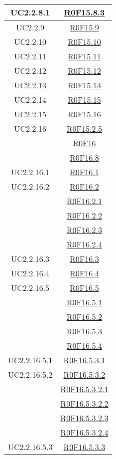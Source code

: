 \documentclass[../AnalisiDeiRequisiti.tex]{subfiles}
\begin{document}
\begin{longtable}{|c|c|}
	UC2.2.8.1 & \hyperlink{R0F15.8.3}{R0F15.8.3}\\\hline
	UC2.2.9 & \hyperlink{R0F15.9}{R0F15.9}\\\hline
	UC2.2.10 & \hyperlink{R0F15.10}{R0F15.10}\\\hline
	UC2.2.11 & \hyperlink{R0F15.11}{R0F15.11}\\\hline
	UC2.2.12 & \hyperlink{R0F15.12}{R0F15.12}\\\hline
	UC2.2.13 & \hyperlink{R0F15.13}{R0F15.13}\\\hline
	UC2.2.14 & \hyperlink{R0F15.15}{R0F15.15}\\\hline
	UC2.2.15 & \hyperlink{R0F15.16}{R0F15.16}\\\hline
	UC2.2.16 & \hyperlink{R0F15.2.5}{R0F15.2.5}\\& \hyperlink{R0F16}{R0F16}\\& \hyperlink{R0F16.8}{R0F16.8}\\\hline
	UC2.2.16.1 & \hyperlink{R0F16.1}{R0F16.1}\\\hline
	UC2.2.16.2 & \hyperlink{R0F16.2}{R0F16.2}\\& \hyperlink{R0F16.2.1}{R0F16.2.1}\\& \hyperlink{R0F16.2.2}{R0F16.2.2}\\& \hyperlink{R0F16.2.3}{R0F16.2.3}\\& \hyperlink{R0F16.2.4}{R0F16.2.4}\\\hline
	UC2.2.16.3 & \hyperlink{R0F16.3}{R0F16.3}\\\hline
	UC2.2.16.4 & \hyperlink{R0F16.4}{R0F16.4}\\\hline
	UC2.2.16.5 & \hyperlink{R0F16.5}{R0F16.5}\\& \hyperlink{R0F16.5.1}{R0F16.5.1}\\& \hyperlink{R0F16.5.2}{R0F16.5.2}\\& \hyperlink{R0F16.5.3}{R0F16.5.3}\\& \hyperlink{R0F16.5.4}{R0F16.5.4}\\\hline
	UC2.2.16.5.1 & \hyperlink{R0F16.5.3.1}{R0F16.5.3.1}\\\hline
	UC2.2.16.5.2 & \hyperlink{R0F16.5.3.2}{R0F16.5.3.2}\\& \hyperlink{R0F16.5.3.2.1}{R0F16.5.3.2.1}\\& \hyperlink{R0F16.5.3.2.2}{R0F16.5.3.2.2}\\& \hyperlink{R0F16.5.3.2.3}{R0F16.5.3.2.3}\\& \hyperlink{R0F16.5.3.2.4}{R0F16.5.3.2.4}\\\hline
	UC2.2.16.5.3 & \hyperlink{R0F16.5.3.3}{R0F16.5.3.3}\\\hline

\end{longtable}
\end{document}
